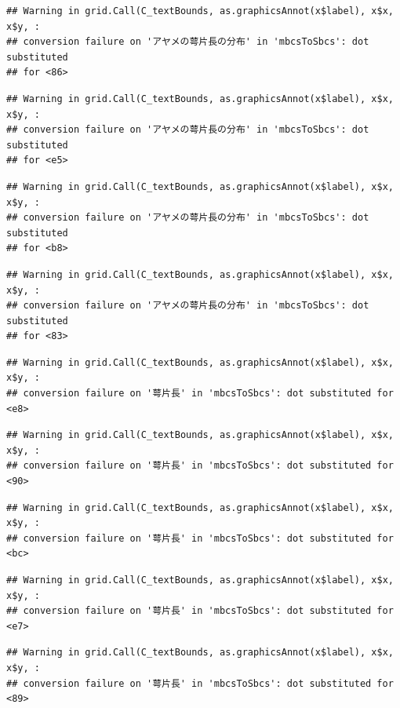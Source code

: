 \documentclass[
]{book}
\begin{document}
\begin{verbatim}
## Warning in grid.Call(C_textBounds, as.graphicsAnnot(x$label), x$x, x$y, :
## conversion failure on 'アヤメの萼片長の分布' in 'mbcsToSbcs': dot substituted
## for <86>
\end{verbatim}

\begin{verbatim}
## Warning in grid.Call(C_textBounds, as.graphicsAnnot(x$label), x$x, x$y, :
## conversion failure on 'アヤメの萼片長の分布' in 'mbcsToSbcs': dot substituted
## for <e5>
\end{verbatim}

\begin{verbatim}
## Warning in grid.Call(C_textBounds, as.graphicsAnnot(x$label), x$x, x$y, :
## conversion failure on 'アヤメの萼片長の分布' in 'mbcsToSbcs': dot substituted
## for <b8>
\end{verbatim}

\begin{verbatim}
## Warning in grid.Call(C_textBounds, as.graphicsAnnot(x$label), x$x, x$y, :
## conversion failure on 'アヤメの萼片長の分布' in 'mbcsToSbcs': dot substituted
## for <83>
\end{verbatim}

\begin{verbatim}
## Warning in grid.Call(C_textBounds, as.graphicsAnnot(x$label), x$x, x$y, :
## conversion failure on '萼片長' in 'mbcsToSbcs': dot substituted for <e8>
\end{verbatim}

\begin{verbatim}
## Warning in grid.Call(C_textBounds, as.graphicsAnnot(x$label), x$x, x$y, :
## conversion failure on '萼片長' in 'mbcsToSbcs': dot substituted for <90>
\end{verbatim}

\begin{verbatim}
## Warning in grid.Call(C_textBounds, as.graphicsAnnot(x$label), x$x, x$y, :
## conversion failure on '萼片長' in 'mbcsToSbcs': dot substituted for <bc>
\end{verbatim}

\begin{verbatim}
## Warning in grid.Call(C_textBounds, as.graphicsAnnot(x$label), x$x, x$y, :
## conversion failure on '萼片長' in 'mbcsToSbcs': dot substituted for <e7>
\end{verbatim}

\begin{verbatim}
## Warning in grid.Call(C_textBounds, as.graphicsAnnot(x$label), x$x, x$y, :
## conversion failure on '萼片長' in 'mbcsToSbcs': dot substituted for <89>
\end{verbatim}
\end{document}

